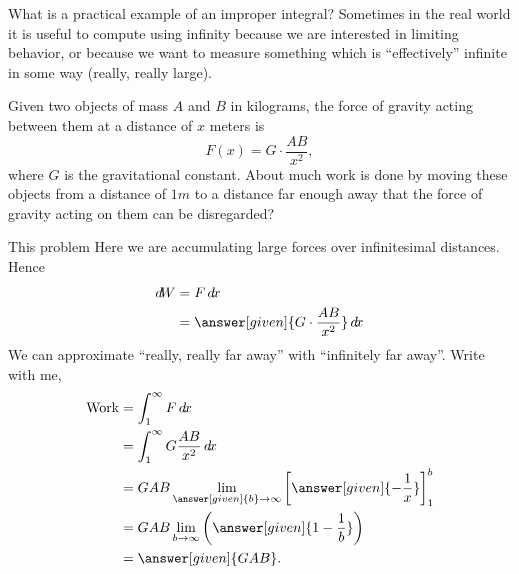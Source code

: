 \documentclass{ximera}
\begin{document}
What is a practical example of an improper integral?  Sometimes in the
real world it is useful to compute using infinity because we are
interested in limiting behavior, or because we want to measure
something which is ``effectively'' infinite in some way (really, really
large).

\begin{example}
  Given two objects of mass $A$ and $B$ in kilograms, the force of
  gravity acting between them at a distance of $x$ meters is
  \[
  F(x) = G\cdot \frac{AB}{x^2},
  \]
  where $G$ is the gravitational constant.  About much work is done by
  moving these objects from a distance of $1 \unit{m}$ to a distance
  far enough away that the force of gravity acting on them can be
  disregarded?
  \begin{explanation}
    This problem Here we are accumulating large forces over
    infinitesimal distances. Hence
    \begin{align*}
      \d W &= F \d x\\
      &= \answer[given]{G\cdot \frac{AB}{x^2}} \d x
    \end{align*}
    We can approximate ``really, really far away'' with ``infinitely far away''. Write with me,
    \begin{align*}
      \textrm{Work} &= \int_1^\infty F \d x\\
      &= \int_1^\infty G\frac{AB}{x^2} \d x\\
      &= GAB \lim_{\answer[given]{b} \to \infty} \eval{\answer[given]{-\frac{1}{x}}}_1^b\\
      &=GAB \lim_{b \to \infty} \left(\answer[given]{1 - \frac{1}{b}}\right)\\
      &=\answer[given]{GAB}.
    \end{align*}
  \end{explanation}
\end{example}
\end{document}
